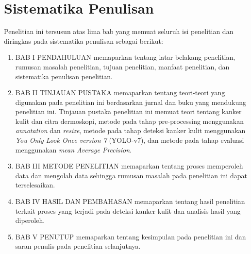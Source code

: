     \section{Sistematika Penulisan}
    Penelitian ini tersusun atas lima bab yang memuat seluruh isi penelitian dan diringkas pada sistematika penulisan sebagai berikut:
    \begin{enumerate}
        \item BAB I PENDAHULUAN
        memaparkan tentang latar belakang penelitian, rumusan masalah penelitian, tujuan penelitian, manfaat penelitian, dan sistematika penulisan penelitian.
        \item BAB II TINJAUAN PUSTAKA
        memaparkan tentang teori-teori yang digunakan pada penelitian ini berdasarkan jurnal dan buku yang mendukung penelitian ini. Tinjauan pustaka penelitian ini memuat teori tentang kanker kulit dan citra dermoskopi, metode pada tahap pre-processing menggunakan \textit{annotation} dan \textit{resize}, metode pada tahap deteksi kanker kulit menggunakan \textit{You Only Look Once version 7} (YOLO-v7), dan metode pada tahap evaluasi menggunakan \textit{mean Average Precision}.
        \item BAB III METODE PENELITIAN 
        memaparkan tentang proses memperoleh data dan mengolah data sehingga rumusan masalah pada penelitian ini dapat terselesaikan.
        \item BAB IV HASIL DAN PEMBAHASAN
        memaparkan tentang hasil penelitian terkait proses yang terjadi pada deteksi kanker kulit dan analisis hasil yang diperoleh.
        \item BAB V PENUTUP
        memaparkan tentang kesimpulan pada penelitian ini dan saran penulis pada penelitian selanjutnya.
    \end{enumerate}